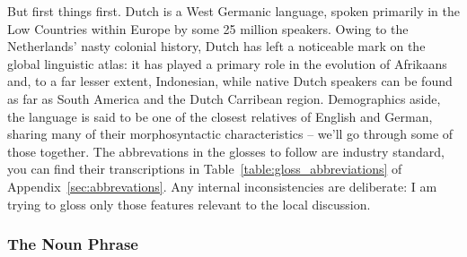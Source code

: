 But first things first.
Dutch is a West Germanic language, spoken primarily in the Low Countries within Europe by some 25 million speakers.
Owing to the Netherlands' nasty colonial history, Dutch has left a noticeable mark on the global linguistic atlas: it has played a primary role in the evolution of Afrikaans and, to a far lesser extent, Indonesian, while native Dutch speakers can be found as far as South America and the Dutch Carribean region.
Demographics aside, the language is said to be one of the closest relatives of English and German, sharing many of their morphosyntactic characteristics -- we'll go through some of those together.
The abbrevations in the glosses to follow are industry standard, you can find their transcriptions in Table~\ref{table:gloss_abbreviations} of Appendix~\ref{sec:abbrevations}.
Any internal inconsistencies are deliberate: I am trying to gloss only those features relevant to the local discussion.

\subsubsection{The Noun Phrase}

